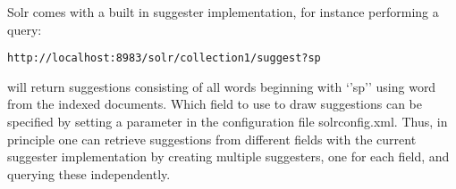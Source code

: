 Solr comes with a built in suggester implementation, for instance performing a query:

\begin{verbatim}
http://localhost:8983/solr/collection1/suggest?sp
\end{verbatim}

will return suggestions consisting of all words beginning with ‘’sp’’ using word from the indexed documents. Which field to use to draw suggestions can be specified by setting a parameter in the configuration file solrconfig.xml. Thus, in principle one can retrieve suggestions from different fields with the current suggester implementation by creating multiple suggesters, one for each field, and querying these independently.






